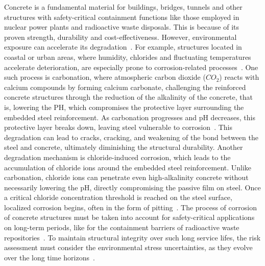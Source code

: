 
Concrete is a fundamental material for buildings, bridges, tunnels and other structures with safety-critical containment functions like those employed in nuclear power plants and radioactive waste disposals.
This is because of its proven strength, durability and cost-effectiveness.
However, environmental exposure can accelerate its degradation~\cite{GLASSER2008226}. For example, structures located in coastal or urban areas, where humidity, chlorides and fluctuating temperatures accelerate deterioration, are especially prone to corrosion-related processes~\cite{qu2021durability}.
One such process is carbonation, where atmospheric carbon dioxide ($CO_2$) reacts with calcium compounds by forming calcium carbonate, challenging the reinforced concrete structures through the reduction of the alkalinity of the concrete, that is, lowering the PH, which compromises the protective layer surrounding the embedded steel reinforcement.
As carbonation progresses and pH decreases, this protective layer breaks down, leaving steel vulnerable to corrosion~\cite{carbonation}.
This degradation can lead to cracks, cracking, and weakening of the bond between the steel and concrete, ultimately diminishing the structural durability.
Another degradation mechanism is chloride-induced corrosion, which leads to the accumulation of chloride ions around the embedded steel reinforcement. Unlike carbonation, chloride ions can penetrate even high-alkalinity concrete without necessarily lowering the pH, directly compromising the passive film on steel.
Once a critical chloride concentration threshold is reached on the steel surface, localized corrosion begins, often in the form of pitting~\cite{shi2012durability}.
The process of corrosion of concrete structures must be taken into account for safety-critical applications on long-term periods, like for the containment barriers of radioactive waste repositories~\cite{walton1990models}.
To maintain structural integrity over such long service lifes, the risk assessment must consider the environmental stress uncertainties, as they evolve over the long time horizons~\cite{lindborg2018climate}.
\\

